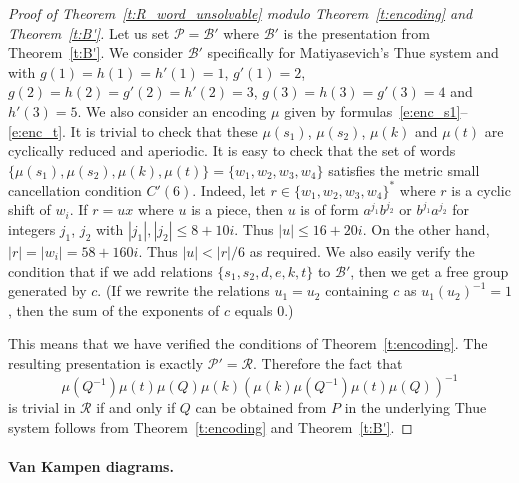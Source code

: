 \documentclass[10pt,a4paper]{article}
\theoremstyle{definition}
\theoremstyle{remark}
\newcommand\BB{\mathcal{B}}
\newcommand\PP{\mathcal{P}}
\newcommand\RR{\mathcal{R}}
\begin{document}
\begin{proof}[Proof of Theorem~\ref{t:R_word_unsolvable} modulo
  Theorem~\ref{t:encoding} and Theorem~\ref{t:B'}]

Let us set $\PP = \BB'$ where $\BB'$ is the presentation from
  Theorem~\ref{t:B'}. We consider $\BB'$ specifically for Matiyasevich's
  Thue system and with $g(1) = h(1) = h'(1) = 1$, $g'(1) = 2$, $g(2) = h(2) =
  g'(2) = h'(2) = 3$, $g(3) = h(3) = g'(3) = 4$ and $h'(3) = 5$. We also
  consider an encoding $\mu$ given by
	formulas~\eqref{e:enc_s1}--\eqref{e:enc_t}. It is trivial to check that these $\mu(s_1)$, $\mu(s_2)$, $\mu(k)$ and $\mu(t)$ are cyclically reduced and aperiodic.
	It is easy to check that the
  set of words $\{\mu(s_1), \mu(s_2), \mu(k), \mu(t)\} =\{w_1, w_2, w_3, w_4\}$ satisfies the metric small
  cancellation condition $C'(6)$. Indeed, let $r \in \{w_1, w_2, w_3, w_4\}^*$
  where $r$ is a cyclic shift of $w_i$. If $r = ux$ where $u$ is a piece, then $u$ is
  of form $a^{j_1}b^{j_2}$ or $b^{j_1}a^{j_2}$ for integers $j_1$, $j_2$
  with $|j_1|, |j_2| \leq 8 + 10i$. Thus $|u|\leq 16 + 20i$. 
  On the other hand, $|r| = |w_i| = 58 + 160i$. Thus $|u| < |r|/6$ as required.
  We also easily verify the condition
  that if we add relations $\{s_1, s_2, d, e, k, t\}$ to $\BB'$, then we get a
  free group generated by $c$. (If we rewrite the relations $u_1 = u_2$ 
  containing $c$ as $u_1(u_2)^{-1} = 1$, then the sum of the exponents of $c$
  equals $0$.)

  This means that we have verified the conditions of Theorem~\ref{t:encoding}.
  The resulting presentation is exactly $\PP' = \RR$. Therefore the fact that 
  \[\mu(Q^{-1})\mu(t)\mu(Q)\mu(k)(\mu(k)\mu(Q^{-1})\mu(t)\mu(Q))^{-1}\]
  is trivial in $\RR$
  if and only if $Q$ can be obtained from $P$ in the underlying Thue system
  follows from Theorem~\ref{t:encoding} and Theorem~\ref{t:B'}.
\end{proof}


\paragraph{Van Kampen diagrams.}
\end{document}
